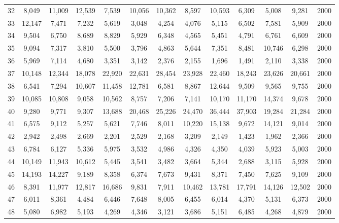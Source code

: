 {\begin{longtable}{ >{\footnotesize}ccccccccccccc}
32  & 8,049  & 11,009 & 12,539 & 7,539  & 10,056 & 10,362 & 8,597  & 10,593 & 6,309  & 5,008  & 9,281  & 2000 \\
33  & 12,147 & 7,471  & 7,232  & 5,619  & 3,048  & 4,254  & 4,076  & 5,115  & 6,502  & 7,581  & 5,909  & 2000 \\
34  & 9,504  & 6,750  & 8,689  & 8,829  & 5,929  & 6,348  & 4,565  & 5,451  & 4,791  & 6,761  & 6,609  & 2000 \\
35  & 9,094  & 7,317  & 3,810  & 5,500  & 3,796  & 4,863  & 5,644  & 7,351  & 8,481  & 10,746 & 6,298  & 2000 \\
36  & 5,969  & 7,114  & 4,680  & 3,351  & 3,142  & 2,376  & 2,155  & 1,696  & 1,491  & 2,110  & 3,338  & 2000 \\
37  & 10,148 & 12,344 & 18,078 & 22,920 & 22,631 & 28,454 & 23,928 & 22,460 & 18,243 & 23,626 & 20,661 & 2000 \\
38  & 6,541  & 7,294  & 10,607 & 11,458 & 12,781 & 6,581  & 8,867  & 12,644 & 9,509  & 9,565  & 9,755  & 2000 \\
39  & 10,085 & 10,808 & 9,058  & 10,562 & 8,757  & 7,206  & 7,141  & 10,170 & 11,170 & 14,374 & 9,678  & 2000 \\
40  & 9,280  & 9,771  & 9,307  & 13,688 & 20,468 & 25,226 & 24,470 & 36,444 & 37,903 & 19,284 & 21,284 & 2000 \\
41  & 6,575  & 9,112  & 5,257  & 5,621  & 7,746  & 8,011  & 10,220 & 15,138 & 9,672  & 14,121 & 9,014  & 2000 \\
42  & 2,942  & 2,498  & 2,669  & 2,201  & 2,529  & 2,168  & 3,209  & 2,149  & 1,423  & 1,962  & 2,366  & 2000 \\
43  & 6,784  & 6,127  & 5,336  & 5,975  & 3,532  & 4,986  & 4,326  & 4,350  & 4,039  & 5,923  & 5,003  & 2000 \\
44  & 10,149 & 11,943 & 10,612 & 5,445  & 3,541  & 3,482  & 3,664  & 5,344  & 2,688  & 3,115  & 5,928  & 2000 \\
45  & 14,193 & 14,227 & 9,189  & 8,358  & 6,374  & 7,673  & 9,431  & 8,371  & 7,450  & 7,625  & 9,109  & 2000 \\
46  & 8,391  & 11,977 & 12,817 & 16,686 & 9,831  & 7,911  & 10,462 & 13,781 & 17,791 & 14,126 & 12,502 & 2000 \\
47  & 6,011  & 8,361  & 4,484  & 6,446  & 7,648  & 8,005  & 6,455  & 6,014  & 4,370  & 5,131  & 6,373  & 2000 \\
48  & 5,080  & 6,982  & 5,193  & 4,269  & 4,346  & 3,121  & 3,686  & 5,151  & 6,485  & 4,268  & 4,879  & 2000 \\

\end{longtable}}
